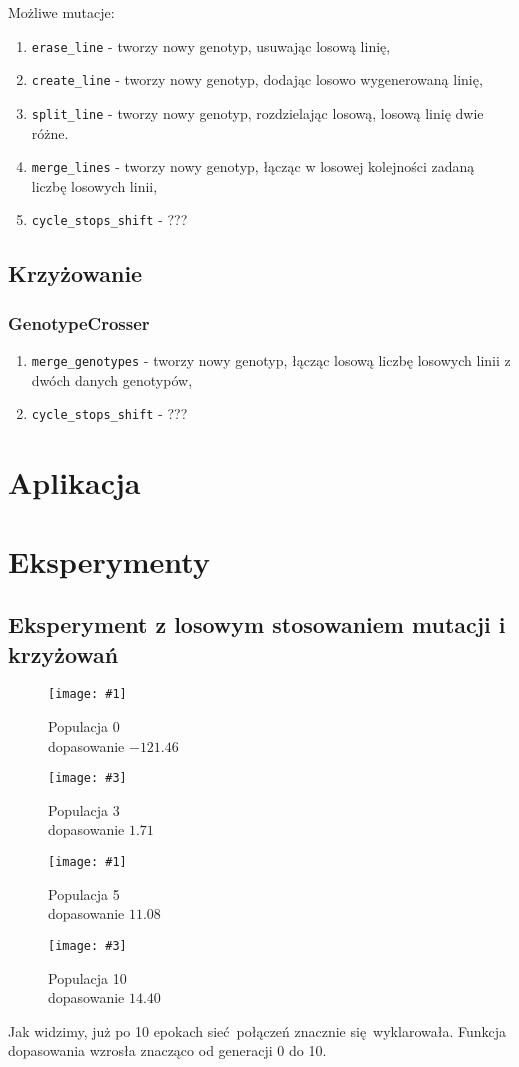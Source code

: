 \documentclass[12pt,a4paper,openright]{mwrep}
\newcommand{\imgsidebyside}[4]{
	\begin{figure}[H]
		\centering
		\begin{minipage}{.45\textwidth}
			\centering
			\texttt{[image: \#1]}
			\caption{#2}
		\end{minipage}%
		\hfill
		\begin{minipage}{.45\textwidth}
			\centering
			\texttt{[image: \#3]}
			\caption{#4}
		\end{minipage}
	\end{figure}
}
\begin{document}
Możliwe mutacje:

\begin{enumerate}
    \item \lstinline{erase_line} - tworzy nowy genotyp, usuwając losową linię,
    \item \lstinline{create_line} - tworzy nowy genotyp, dodając losowo wygenerowaną linię,
    \item \lstinline{split_line} - tworzy nowy genotyp, rozdzielając losową, losową linię dwie różne.
    \item \lstinline{merge_lines} - tworzy nowy genotyp, łącząc w losowej kolejności zadaną liczbę losowych linii,
    \item \lstinline{cycle_stops_shift} - ???
\end{enumerate}

\section{Krzyżowanie}

\subsection{GenotypeCrosser}

\begin{enumerate}
    \item \lstinline{merge_genotypes} - tworzy nowy genotyp, łącząc losową liczbę losowych linii z dwóch danych genotypów,
    \item \lstinline{cycle_stops_shift} - ???
\end{enumerate}

\chapter{Aplikacja}

\chapter{Eksperymenty}

\section{Eksperyment z losowym stosowaniem mutacji i krzyżowań}
\imgsidebyside{test1/0}{Populacja 0\\ dopasowanie $-121.46$}{test1/3}{Populacja 3\\ dopasowanie $1.71$}
\imgsidebyside{test1/5}{Populacja 5\\ dopasowanie $11.08$}{test1/10}{Populacja 10\\ dopasowanie $14.40$}
Jak widzimy, już po 10 epokach sieć połączeń znacznie się wyklarowała. Funkcja dopasowania wzrosła znacząco od generacji 0 do 10.
\end{document}
